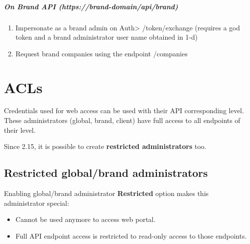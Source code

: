 \documentclass[letterpaper,10pt,spanish]{sphinxmanual}
\begin{document}
\paragraph{On Brand API (https://brand-domain/api/brand)}
\begin{enumerate}
\item {} 
Impersonate as a brand admin on Auth\textgreater{} /token/exchange (requires a god token and a brand administrator user name obtained in 1-d)

\item {} 
Request brand companies using the endpoint /companies

\end{enumerate}


\chapter{ACLs}
\label{api_rest/acls:acls}\label{api_rest/acls::doc}
Credentials used for web access can be used with their API corresponding level. These administrators (global, brand, client)
have full access to all endpoints of their level.

Since 2.15, it is possible to create \textbf{restricted administrators} too.


\section{Restricted global/brand administrators}
\label{api_rest/acls:restricted-global-brand-administrators}
Enabling global/brand administrator \textbf{Restricted} option makes this administrator special:
\begin{itemize}
\item {} 
Cannot be used anymore to access web portal.

\item {} 
Full API endpoint access is restricted to read-only access to those endpoints.

\end{itemize}
\end{document}
